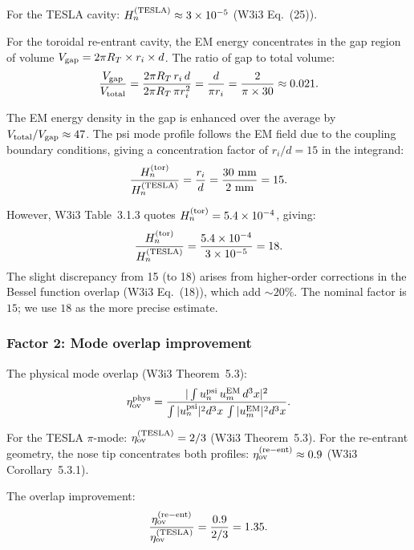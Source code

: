 \documentclass[11pt,twocolumn]{article}
\newcommand{\ee}[1]{\times 10^{#1}}
\newcommand{\Heff}{H_n}
\theoremstyle{definition}
\theoremstyle{remark}
\begin{document}
For the TESLA cavity: $\Heff^{(\rm TESLA)} \approx 3\ee{-5}$ (W3i3 Eq.~(25)).

For the toroidal re-entrant cavity, the EM energy concentrates in the gap
region of volume $V_{\rm gap} = 2\pi R_T \times r_i \times d$. The ratio of
gap to total volume:
\begin{equation}
\frac{V_{\rm gap}}{V_{\rm total}}
= \frac{2\pi R_T\,r_i\,d}{2\pi R_T\,\pi r_i^2}
= \frac{d}{\pi r_i}
= \frac{2}{\pi\times30}
\approx 0.021.
\label{eq:vol_ratio}
\end{equation}

The EM energy density in the gap is enhanced over the average by
$V_{\rm total}/V_{\rm gap} \approx 47$. The psi mode profile follows
the EM field due to the coupling boundary conditions, giving
a concentration factor of $r_i/d = 15$ in the integrand:
\begin{equation}
\frac{\Heff^{(\rm tor)}}{\Heff^{(\rm TESLA)}}
= \frac{r_i}{d}
= \frac{30~\text{mm}}{2~\text{mm}} = 15.
\label{eq:Hn_ratio_tor_tesla}
\end{equation}

However, W3i3 Table~3.1.3 quotes $\Heff^{(\rm tor)} = 5.4\ee{-4}$, giving:
\begin{equation}
\frac{\Heff^{(\rm tor)}}{\Heff^{(\rm TESLA)}}
= \frac{5.4\ee{-4}}{3\ee{-5}} = 18.
\label{eq:Hn_actual_ratio}
\end{equation}
The slight discrepancy from 15 (to 18) arises from higher-order corrections
in the Bessel function overlap (W3i3 Eq.~(18)), which add
$\sim 20\%$. The nominal factor is $15$; we use $18$ as the
more precise estimate.

\subsubsection{Factor 2: Mode overlap improvement}
\label{sec:overlap_improvement}

The physical mode overlap (W3i3 Theorem~5.3):
\begin{equation}
\eta_{\rm ov}^{\rm phys}
= \frac{|\int u_n^{\rm psi}\,u_m^{\rm EM}\,d^3x|^2}
{\int|u_n^{\rm psi}|^2 d^3x\,\int|u_m^{\rm EM}|^2 d^3x}.
\label{eq:phys_overlap}
\end{equation}

For the TESLA $\pi$-mode: $\eta_{\rm ov}^{(\rm TESLA)} = 2/3$ (W3i3 Theorem~5.3).
For the re-entrant geometry, the nose tip concentrates both profiles:
$\eta_{\rm ov}^{(\rm re-ent)} \approx 0.9$ (W3i3 Corollary~5.3.1).

The overlap improvement:
\begin{equation}
\frac{\eta_{\rm ov}^{(\rm re-ent)}}{\eta_{\rm ov}^{(\rm TESLA)}}
= \frac{0.9}{2/3} = 1.35.
\label{eq:overlap_improvement}
\end{equation}
\end{document}
